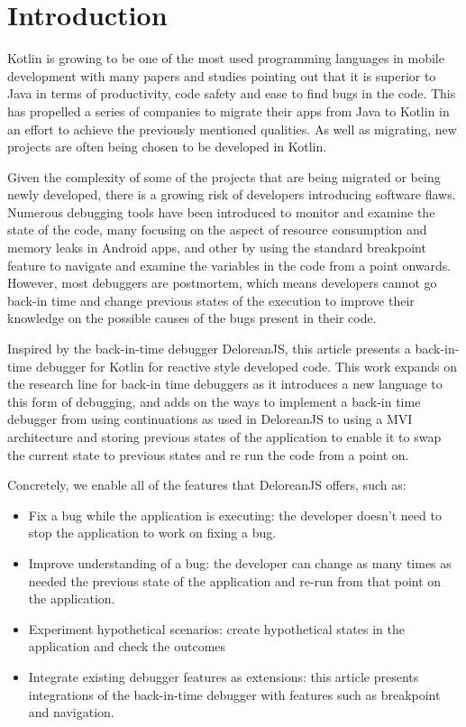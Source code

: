 
\chapter{Introduction}
\label{cha:introduction}
Kotlin is growing to be one of the most used programming languages in mobile development with many papers and studies pointing out that it is superior to Java in terms of productivity, code safety and ease to find bugs in the code. This has propelled a series of companies to migrate their apps from Java to Kotlin in an effort to achieve the previously mentioned qualities. As well as migrating, new projects are often being chosen to be developed in Kotlin. 

Given the complexity of some of the projects that are being migrated or being newly developed, there is a growing risk of developers introducing software flaws.  Numerous debugging tools have been introduced to monitor and examine the state of the code, many focusing on the aspect of resource consumption and memory leaks in Android apps, and other by using the standard breakpoint feature to navigate and examine the variables in the code from a point onwards. However, most debuggers are postmortem, which means developers cannot go back-in time and change previous states of the execution to improve their knowledge on the possible causes of the bugs present in their code. 

Inspired by the back-in-time debugger DeloreanJS, this article presents a back-in-time debugger for Kotlin for reactive style developed code. This work expands on the research line for back-in time debuggers as it introduces a new language to this form of debugging, and adds on the ways to implement a back-in time debugger from using continuations as used in DeloreanJS to using a MVI architecture and storing previous states of the application to enable it to swap the current state to previous states and re run the code from a point on.

Concretely, we enable all of the features that DeloreanJS offers, such as:
\begin{itemize}
    \item Fix a bug while the application is executing: the developer doesn’t need to stop the application to work on fixing a bug.
    \item Improve understanding of a bug: the developer can change as many times as needed the previous state of the application and re-run from that point on the application.
    \item Experiment hypothetical scenarios: create hypothetical states in the application and check the outcomes
    \item Integrate existing debugger features as extensions: this article presents integrations of the back-in-time debugger with features such as breakpoint and navigation.
\end{itemize}


